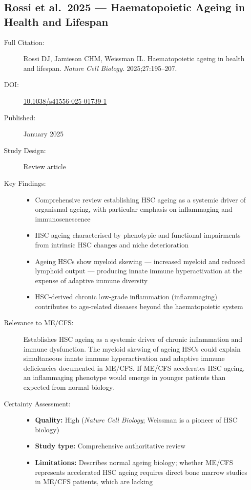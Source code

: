 \subsection{Rossi et al.\ 2025 --- Haematopoietic Ageing in Health and Lifespan}

\begin{description}
    \item[Full Citation:] Rossi DJ, Jamieson CHM, Weissman IL. Haematopoietic ageing in health and lifespan. \textit{Nature Cell Biology}. 2025;27:195--207.
    \item[DOI:] \href{https://doi.org/10.1038/s41556-025-01739-1}{10.1038/s41556-025-01739-1}
    \item[Published:] January 2025
    \item[Study Design:] Review article
    \item[Key Findings:]
    \begin{itemize}
        \item Comprehensive review establishing HSC ageing as a systemic driver of organismal ageing, with particular emphasis on inflammaging and immunosenescence
        \item HSC ageing characterised by phenotypic and functional impairments from intrinsic HSC changes and niche deterioration
        \item Ageing HSCs show myeloid skewing --- increased myeloid and reduced lymphoid output --- producing innate immune hyperactivation at the expense of adaptive immune diversity
        \item HSC-derived chronic low-grade inflammation (inflammaging) contributes to age-related diseases beyond the haematopoietic system
    \end{itemize}
    \item[Relevance to ME/CFS:] Establishes HSC ageing as a systemic driver of chronic inflammation and immune dysfunction. The myeloid skewing of ageing HSCs could explain simultaneous innate immune hyperactivation and adaptive immune deficiencies documented in ME/CFS. If ME/CFS accelerates HSC ageing, an inflammaging phenotype would emerge in younger patients than expected from normal biology.
    \item[Certainty Assessment:]
    \begin{itemize}
        \item \textbf{Quality:} High (\textit{Nature Cell Biology}; Weissman is a pioneer of HSC biology)
        \item \textbf{Study type:} Comprehensive authoritative review
        \item \textbf{Limitations:} Describes normal ageing biology; whether ME/CFS represents accelerated HSC ageing requires direct bone marrow studies in ME/CFS patients, which are lacking
    \end{itemize}
\end{description}

